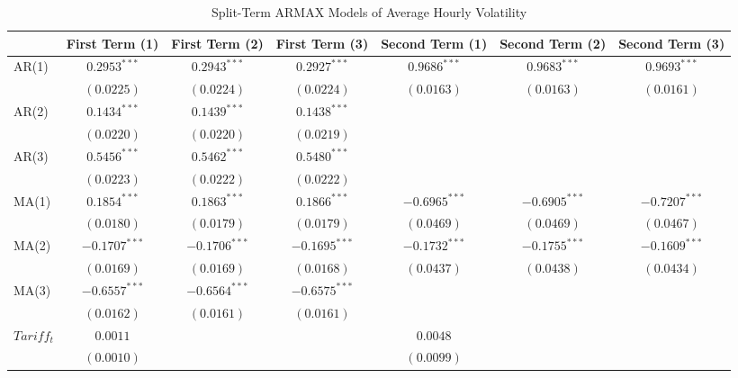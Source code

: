 
\begin{table}
\caption{Split-Term ARMAX Models of Average Hourly Volatility}
\begin{center}
\begin{tabular}{l c c c c c c}
\hline
 & First Term (1) & First Term (2) & First Term (3) & Second Term (1) & Second Term (2) & Second Term (3) \\
\hline
AR(1)          & $0.2953^{***}$  & $0.2943^{***}$  & $0.2927^{***}$  & $0.9686^{***}$  & $0.9683^{***}$  & $0.9693^{***}$  \\
               & $(0.0225)$      & $(0.0224)$      & $(0.0224)$      & $(0.0163)$      & $(0.0163)$      & $(0.0161)$      \\
AR(2)          & $0.1434^{***}$  & $0.1439^{***}$  & $0.1438^{***}$  &                 &                 &                 \\
               & $(0.0220)$      & $(0.0220)$      & $(0.0219)$      &                 &                 &                 \\
AR(3)          & $0.5456^{***}$  & $0.5462^{***}$  & $0.5480^{***}$  &                 &                 &                 \\
               & $(0.0223)$      & $(0.0222)$      & $(0.0222)$      &                 &                 &                 \\
MA(1)          & $0.1854^{***}$  & $0.1863^{***}$  & $0.1866^{***}$  & $-0.6965^{***}$ & $-0.6905^{***}$ & $-0.7207^{***}$ \\
               & $(0.0180)$      & $(0.0179)$      & $(0.0179)$      & $(0.0469)$      & $(0.0469)$      & $(0.0467)$      \\
MA(2)          & $-0.1707^{***}$ & $-0.1706^{***}$ & $-0.1695^{***}$ & $-0.1732^{***}$ & $-0.1755^{***}$ & $-0.1609^{***}$ \\
               & $(0.0169)$      & $(0.0169)$      & $(0.0168)$      & $(0.0437)$      & $(0.0438)$      & $(0.0434)$      \\
MA(3)          & $-0.6557^{***}$ & $-0.6564^{***}$ & $-0.6575^{***}$ &                 &                 &                 \\
               & $(0.0162)$      & $(0.0161)$      & $(0.0161)$      &                 &                 &                 \\
$Tariff_{t}$   & $0.0011$        &                 &                 & $0.0048$        &                 &                 \\
               & $(0.0010)$      &                 &                 & $(0.0099)$      &                 &                 \\

\end{tabular}
\end{center}
\end{table}
